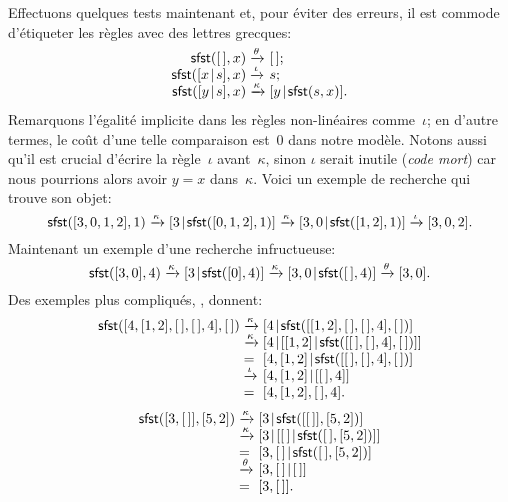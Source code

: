 Effectuons quelques tests maintenant et, pour éviter des erreurs, il
est commode d'étiqueter les règles avec des lettres grecques:
\begin{equation*}
\begin{array}{r@{\;}l@{\;}l}
\fun{sfst}(\el,x)          & \smashedrightarrow{\theta} & \el;\\
\fun{sfst}(\cons{x}{s},x)  & \smashedrightarrow{\iota}  & s;\\
\fun{sfst}(\cons{y}{s},x)  & \smashedrightarrow{\kappa} &
\cons{y}{\fun{sfst}(s,x)}.
\end{array}
\end{equation*}
Remarquons l'égalité implicite dans les règles non-linéaires
comme~\(\iota\); en d'autre termes, le coût d'une telle comparaison
est~\(0\) dans notre modèle. Notons aussi qu'il est crucial d'écrire
la règle~\(\iota\) avant~\(\kappa\), sinon \(\iota\) serait inutile
(\emph{code mort}) car nous
pourrions alors avoir \(y = x\) dans~\(\kappa\). Voici un
exemple de recherche qui trouve son
objet:
\begin{equation*}
\textsf{sfst}([3,0,1,2],1) \xrightarrow{\smash{\kappa}}
[{3}\!\mid\!{\textsf{sfst}([0,1,2],1)}] \xrightarrow{\smash{\kappa}}
[{3,0}\!\mid\!{\textsf{sfst}([1,2],1)}] \xrightarrow{\smash{\iota}} [3,0,2].
\end{equation*}
Maintenant un exemple d'une recherche
infructueuse:
\begin{equation*}
\textsf{sfst}([3,0],4) \xrightarrow{\smash{\kappa}}
[{3}\!\mid\!{\textsf{sfst}([0],4)}] \xrightarrow{\smash{\kappa}}
[{3,0}\!\mid\!{\textsf{sfst}([\,],4)}] \xrightarrow{\smash{\theta}}
[3,0].
\end{equation*}
Des exemples plus compliqués, , donnent:
\begin{equation*}
\begin{array}{r@{\;}l@{\;}l}
\fun{sfst}([4,[1,2],\el,\el,4],\el)
& \smashedrightarrow{\kappa} &
  \cons{4}{\fun{sfst}([[1,2],\el,\el,4],\el)}\\
& \smashedrightarrow{\kappa} &
  \cons{4}{\cons{[1,2]}{\fun{sfst}([\el,\el,4],\el)}}\\
& = & \cons{4, [1,2]}{\fun{sfst}([\el,\el,4],\el)}\\
& \smashedrightarrow{\iota} & \cons{4,[1,2]}{[\el,4]}\\
& = & [4,[1,2],\el,4].
\end{array}
\end{equation*}
\begin{equation*}
\begin{array}{r@{\;}l@{\;}l}
\fun{sfst}([3,\el],[5,2])
& \smashedrightarrow{\kappa} & \cons{3}{\fun{sfst}([\el],[5,2])}\\
& \smashedrightarrow{\kappa} & \cons{3}{\cons{\el}{\fun{sfst}(\el,[5,2])}}\\
& = & \cons{3,\el}{\fun{sfst}(\el,[5,2])}\\
& \smashedrightarrow{\theta} & \cons{3,\el}{\el}\\
& = & [3,\el].
\end{array}
\end{equation*}
